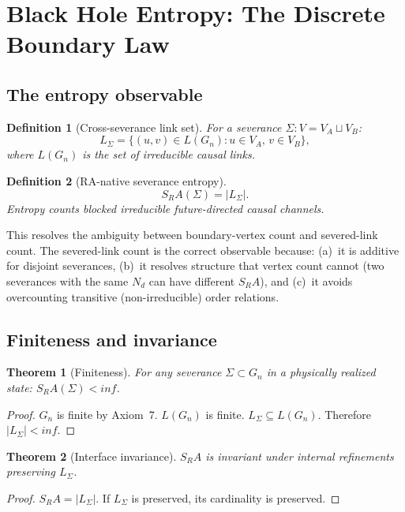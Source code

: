 \documentclass[11pt]{article}
\def\mathrm#1{#1}%
\def\infty{inf}%
\def\partial{d}%
\def\SRa{S_RA}%
\newtheorem{definition}{Definition}
\newtheorem{theorem}{Theorem}
\newcommand{\SRa}{S_{\mathrm{RA}}}
\begin{document}
\section{Black Hole Entropy: The Discrete Boundary Law}
\label{sec:entropy}

\subsection{The entropy observable}

\begin{definition}[Cross-severance link set]
For a severance $\Sigma:V=V_A\sqcup V_B$:
\[
L_\Sigma=\{(u,v)\in L(G_n):u\in V_A,\,v\in V_B\},
\]
where $L(G_n)$ is the set of irreducible causal links.
\end{definition}

\begin{definition}[RA-native severance entropy]
\begin{equation}
\boxed{\SRa(\Sigma)=|L_\Sigma|.}
\end{equation}
Entropy counts blocked irreducible future-directed causal channels.
\end{definition}

This resolves the ambiguity between boundary-vertex count and severed-link count. The severed-link count is the correct observable because: (a)~it is additive for disjoint severances, (b)~it resolves structure that vertex count cannot (two severances with the same $N_\partial$ can have different $\SRa$), and (c)~it avoids overcounting transitive (non-irreducible) order relations.

\subsection{Finiteness and invariance}

\begin{theorem}[Finiteness]
For any severance $\Sigma\subset G_n$ in a physically realized state: $\SRa(\Sigma)<\infty$.
\end{theorem}
\begin{proof}
$G_n$ is finite by Axiom~7. $L(G_n)$ is finite. $L_\Sigma\subseteq L(G_n)$. Therefore $|L_\Sigma|<\infty$.
\end{proof}

\begin{theorem}[Interface invariance]
$\SRa$ is invariant under internal refinements preserving $L_\Sigma$.
\end{theorem}
\begin{proof}
$\SRa=|L_\Sigma|$. If $L_\Sigma$ is preserved, its cardinality is preserved.
\end{proof}
\end{document}
